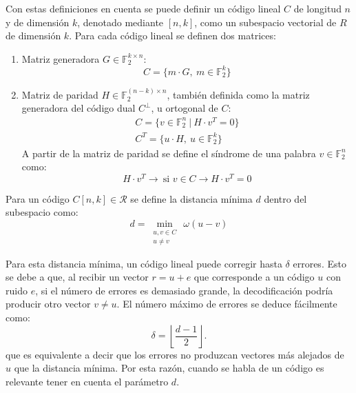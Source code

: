 Con estas definiciones en cuenta se puede definir un código lineal \(C\) de longitud \(n\) y de dimensión \(k\), denotado mediante \([n,k]\), como un subespacio vectorial de \(R\) de dimensión \(k\). Para cada código lineal se definen dos matrices:
\begin{enumerate}
	\item Matriz generadora \(G\in \mathbb{F}_2^{k\times n}\):
	\begin{equation}
		C=\{m\cdot G, \ m\in \mathbb{F}_2^k\}
	\end{equation}
	\item Matriz de paridad \(H \in \mathbb{F}_2^{(n-k)\times n}\), también definida como la matriz generadora del código dual \(C^\bot\), u ortogonal de \(C\):
	\begin{equation}
		\begin{array}{l}
			C=\{v\in \mathbb{F}_2^n \ | \ H\cdot v^T=0 \}\\
			C^T= \{u\cdot H, \ u\in \mathbb{F}_2^k\}
		\end{array}
	\end{equation}
	A partir de la matriz de paridad se define el síndrome de una palabra \(v\in \mathbb{F}_2^n\) como:
	\begin{equation}
		H\cdot v^T \rightarrow \ \text{si } v\in C \rightarrow H\cdot v^T =0
	\end{equation} 
\end{enumerate}

Para un código \(C[n,k]\in \mathcal{R}\) se define la distancia mínima \(d\) dentro del subespacio como:
\begin{equation}
	d= \min_{\substack{u, v \in C \\ u \neq v}} \, \omega(u-v)
\end{equation}

Para esta distancia mínima, un código lineal puede corregir hasta \(\delta\) errores. Esto se debe a que, al recibir un vector \(r=u+e\) que corresponde a un código \(u\) con ruido \(e\), si el número de errores es demasiado grande, la decodificación podría producir otro vector \(v \neq u\). El número máximo de errores se deduce fácilmente como:
\begin{equation}
	\delta = \left\lfloor \frac{d-1}{2} \right\rfloor.
\end{equation}
que es equivalente a decir que los errores no produzcan vectores más alejados de \(u\) que la distancia mínima. Por esta razón, cuando se habla de un código es relevante tener en cuenta el parámetro \(d\).
\newline

